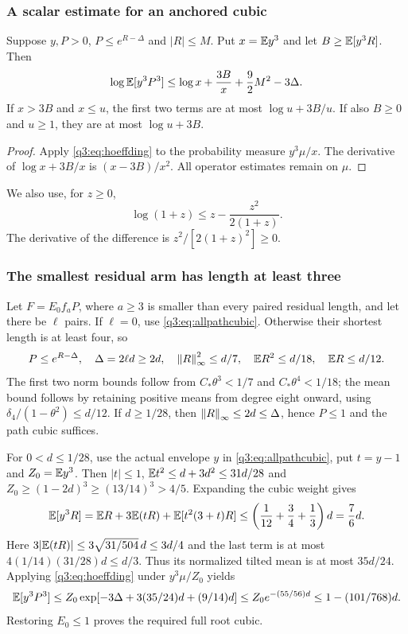 \subsubsection{A scalar estimate for an anchored cubic}
\begin{lemma}\label{q3:lem:tiltedcubic}
Suppose $y,P>0$, $P\le e^{R-\Delta}$ and $|R|\le M$. Put $x=\mathbb E y^3$ and let $B\ge\mathbb E[y^3R]$. Then
\[
 \log\mathbb E[y^3P^3]\le\log x+\frac{3B}{x}+\frac92M^2-3\Delta.
\]
If $x>3B$ and $x\le u$, the first two terms are at most $\log u+3B/u$. If also $B\ge0$ and $u\ge1$, they are at most $\log u+3B$.
\end{lemma}
\begin{proof}
Apply \eqref{q3:eq:hoeffding} to the probability measure $y^3\mu/x$. The derivative of $\log x+3B/x$ is $(x-3B)/x^2$. All operator estimates remain on $\mu$.
\end{proof}
We also use, for $z\ge0$,
\begin{equation}\label{q3:eq:logbound}
 \log(1+z)\le z-\frac{z^2}{2(1+z)}.
\end{equation}
The derivative of the difference is $z^2/[2(1+z)^2]\ge0$.

\subsubsection{The smallest residual arm has length at least three}
Let $F=E_0f_aP$, where $a\ge3$ is smaller than every paired residual length, and let there be $\ell$ pairs. If $\ell=0$, use \eqref{q3:eq:allpathcubic}. Otherwise their shortest length is at least four, so
\[
 P\le e^{R-\Delta},\quad \Delta=2\ell d\ge2d,\quad
 \left\lVert R\right\rVert_\infty^2\le d/7,\quad \mathbb E R^2\le d/18,\quad \mathbb E R\le d/12.
\]
The first two norm bounds follow from $C_*\theta^3<1/7$ and $C_*\theta^4<1/18$; the mean bound follows by retaining positive means from degree eight onward, using
$\delta_{4}/(1-\theta^2)\le d/12$.
If $d\ge1/28$, then $\left\lVert R\right\rVert_\infty\le2d\le\Delta$, hence $P\le1$ and the path cubic suffices.

For $0<d\le1/28$, use the actual envelope $y$ in \eqref{q3:eq:allpathcubic}, put $t=y-1$ and $Z_0=\mathbb E y^3$. Then $|t|\le1$,
$\mathbb E t^2\le d+3d^2\le31d/28$ and $Z_0\ge(1-2d)^3\ge(13/14)^3>4/5$. Expanding the cubic weight gives
\[
 \mathbb E[y^3R]=\mathbb E R+3\mathbb E(tR)+\mathbb E[t^2(3+t)R]
 \le\left(\frac1{12}+\frac34+\frac13\right)d=\frac76d.
\]
Here $3|\mathbb E(tR)|\le3\sqrt{31/504}\,d\le3d/4$ and the last term is at most
$4(1/14)(31/28)d\le d/3$. Thus its normalized tilted mean is at most $35d/24$. Applying \eqref{q3:eq:hoeffding} under $y^3\mu/Z_0$ yields
\[
 \mathbb E[y^3P^3]\le Z_0\exp[-3\Delta+3(35/24)d+(9/14)d]
 \le Z_0e^{-(55/56)d}\le1-(101/768)d.
\]
Restoring $E_0\le1$ proves the required full root cubic.

